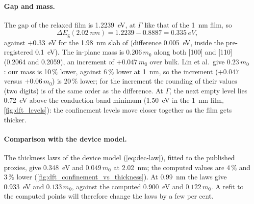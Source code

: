 \paragraph{Gap and mass.} The gap of the relaxed film is 1.2239~eV, at $\Gamma$ like that of the 1~nm film, so
\begin{equation}
\Delta E_{\mathrm{g}}(\SI{2.02}{nm}) = 1.2239 - 0.8887 = \SI{0.335}{eV},
\label{eq:dft-deg2}
\end{equation}
against $+0.33$~eV for the 1.98~nm slab of \citet[p.~21542]{Lin2022} (difference 0.005~eV, inside the pre-registered
0.1~eV). The in-plane mass is $0.206\,m_0$ along both [100] and [110] (0.2064 and 0.2059), an increment of
$+0.047\,m_0$ over bulk. Lin et al.\ give $0.23\,m_0$ \citep[p.~21540]{Lin2022}: our mass is 10\,\% lower, against
6\,\% lower at 1~nm, so the increment ($+0.047$ versus $+0.06\,m_0$) is 20\,\% lower; for the increment the rounding of
their values (two digits) is of the same order as the difference. At $\Gamma$, the next empty level lies 0.72~eV above
the conduction-band minimum (1.50~eV in the 1~nm film, \cref{fig:dft_levels}): the confinement levels move closer
together as the film gets thicker.

\paragraph{Comparison with the device model.} The thickness laws of the device model (\cref{eq:dec-law}), fitted to
the published proxies, give 0.348~eV and $0.049\,m_0$ at 2.02~nm; the computed values are 4\,\% and 3\,\% lower
(\cref{fig:dft_confinement_vs_thickness}). At 0.99~nm the laws give 0.933~eV and $0.133\,m_0$, against the computed 0.900~eV
and $0.122\,m_0$. A refit to the computed points will therefore change the laws by a few per cent.

